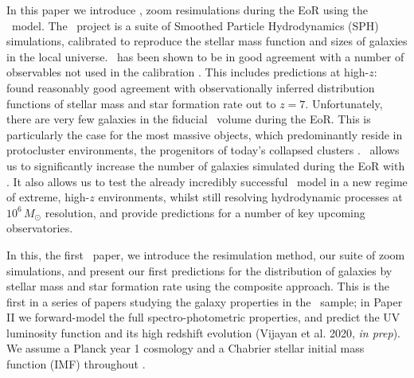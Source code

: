In this paper we introduce \flares, zoom resimulations during the EoR using the \eagle\ model.
The \eagle\ project \citep{schaye_eagle_2015,crain_galaxies-intergalactic_2009} is a suite of Smoothed Particle Hydrodynamics (SPH) simulations, calibrated to reproduce the stellar mass function and sizes of galaxies in the local universe.
\eagle\ has been shown to be in good agreement with a number of observables not used in the calibration \citep[e.g.][]{lagos_molecular_2015,bahe_distribution_2016,furlong_size_2017,trayford_colours_2015,trayford_optical_2017,crain_eagle_2017}.
This includes predictions at high-$z$: \cite{furlong_evolution_2015} found reasonably good agreement with observationally inferred distribution functions of stellar mass and star formation rate out to $z = 7$.
Unfortunately, there are very few galaxies in the fiducial \eagle\ volume during the EoR.
This is particularly the case for the most massive objects, which predominantly reside in protocluster environments, the progenitors of today's collapsed clusters \citep{chiang_galaxy_2017,lovell_characterising_2018}.
\flares\ allows us to significantly increase the number of galaxies simulated during the EoR with \eagle.
It also allows us to test the already incredibly successful \eagle\ model in a new regime of extreme, high-$z$ environments, whilst still resolving hydrodynamic processes at $10^{6} \, M_{\odot}$ resolution, and provide predictions for a number of key upcoming observatories.

In this, the first \flares\ paper, we introduce the resimulation method, our suite of zoom simulations, and present our first predictions for the distribution of galaxies by stellar mass and star formation rate using the composite approach.
This is the first in a series of papers studying the galaxy properties in the \flares\ sample; in Paper II we forward-model the full spectro-photometric properties, and predict the UV luminosity function and its high redshift evolution (Vijayan et al. 2020, \textit{in prep}).
We assume a Planck year 1 cosmology \citep[$\Omega_{0} = 0.315$, $\Omega_{\Lambda} = 0.685$, $h = 0.673$, ][]{planck_collaboration_planck_2014} and a Chabrier stellar initial mass function (IMF) throughout \citep{chabrier_galactic_2003}.

